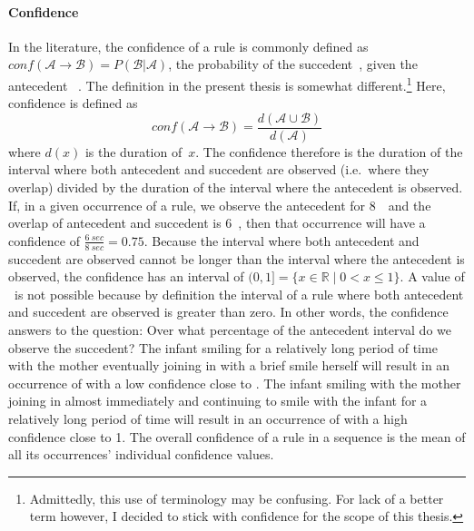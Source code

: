 \paragraph{Confidence}
In the literature, the confidence of a rule  is commonly defined as \(conf(\mathcal{A\rightarrow B}) = P(\mathcal{B|A})\), the probability of the succedent~, given the antecedent~ \citep[]{han_data_2012}.
The definition in the present thesis is somewhat different.\footnote{%
Admittedly, this use of terminology may be confusing. For lack of a better term however, I decided to stick with confidence for the scope of this thesis.}
Here, confidence is defined as
\[conf(\mathcal{A \rightarrow B}) = \frac{d(\mathcal{A \cup B})}{d(\mathcal{A})}\]
where \(d(x)\) is the duration of~\(x\).
The confidence therefore is the duration of the interval where both antecedent and succedent are observed (i.e.~where they overlap) divided by the duration of the interval where the antecedent is observed.
If, in a given occurrence of a rule, we observe the antecedent for 8~\s\ and the overlap of antecedent and succedent is 6~\s, then that occurrence will have a confidence of \(\frac{6~sec}{8~sec} = 0.75\).
Because the interval where both antecedent and succedent are observed cannot be longer than the interval where the antecedent is observed, the confidence has an interval of \((0, 1] = \{x \in \mathbb{R} \mid 0 < x \leq 1 \}\).
A value of \zero\ is not possible because by definition the interval of a rule where both antecedent and succedent are observed is greater than zero.
In other words, the confidence answers to the question:
Over what percentage of the antecedent interval do we observe the succedent?
The infant smiling for a relatively long period of time with the mother eventually joining in with a brief smile herself will result in an occurrence of  with a low confidence close to \zero.
The infant smiling with the mother joining in almost immediately and continuing to smile with the infant for a relatively long period of time will result in an occurrence of  with a high confidence close to 1.
The overall confidence of a rule in a sequence is the mean of all its occurrences' individual confidence values.

